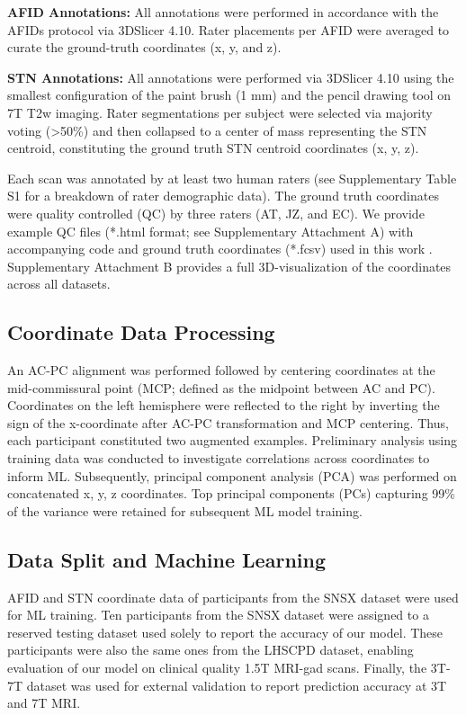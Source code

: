 \textbf{AFID Annotations:} All annotations were performed in accordance with the AFIDs protocol via 3DSlicer 4.10. Rater placements per AFID were averaged to curate the ground-truth coordinates (x, y, and z).

\textbf{STN Annotations:} All annotations were performed via 3DSlicer 4.10 \cite{ref} using the smallest configuration of the paint brush (1 mm) and the pencil drawing tool on 7T T2w imaging. Rater segmentations per subject were selected via majority voting (>50\%) and then collapsed to a center of mass representing the STN centroid, constituting the ground truth STN centroid coordinates (x, y, z).

Each scan was annotated by at least two human raters (see Supplementary Table S1 for a breakdown of rater demographic data). The ground truth coordinates were quality controlled (QC) by three raters (AT, JZ, and EC). We provide example QC files (*.html format; see Supplementary Attachment A) with accompanying code and ground truth coordinates (*.fcsv) used in this work \cite{ref}. Supplementary Attachment B provides a full 3D-visualization of the coordinates across all datasets.

\subsection{Coordinate Data Processing}
An AC-PC alignment was performed followed by centering coordinates at the mid-commissural point (MCP; defined as the midpoint between AC and PC). Coordinates on the left hemisphere were reflected to the right by inverting the sign of the x-coordinate after AC-PC transformation and MCP centering. Thus, each participant constituted two augmented examples. Preliminary analysis using training data was conducted to investigate correlations across coordinates to inform ML. Subsequently, principal component analysis (PCA) was performed on concatenated x, y, z coordinates. Top principal components (PCs) capturing 99\% of the variance were retained for subsequent ML model training.

\subsection{Data Split and Machine Learning}
AFID and STN coordinate data of participants from the SNSX dataset were used for ML training. Ten participants from the SNSX dataset were assigned to a reserved testing dataset used solely to report the accuracy of our model. These participants were also the same ones from the LHSCPD dataset, enabling evaluation of our model on clinical quality 1.5T MRI-gad scans. Finally, the 3T-7T dataset was used for external validation to report prediction accuracy at 3T and 7T MRI.

